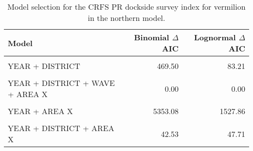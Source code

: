 \documentclass[
]{article}
\begin{document}
\begin{table}

\caption{\label{tab:tab-model-select-crfspr}Model selection for the CRFS PR dockside survey index for vermilion in the northern model.}
\centering
\begin{tabular}[t]{lrr}
\toprule
Model & Binomial $\Delta$AIC & Lognormal $\Delta$AIC\\
\midrule
\cellcolor{gray!6}{1} & \cellcolor{gray!6}{6137.96} & \cellcolor{gray!6}{1832.84}\\
YEAR + DISTRICT & 469.50 & 83.21\\
\cellcolor{gray!6}{YEAR + DISTRICT + WAVE} & \cellcolor{gray!6}{425.71} & \cellcolor{gray!6}{34.01}\\
YEAR + DISTRICT + WAVE + AREA X & 0.00 & 0.00\\
\cellcolor{gray!6}{YEAR + WAVE} & \cellcolor{gray!6}{5198.73} & \cellcolor{gray!6}{1446.58}\\
\addlinespace
YEAR + AREA X & 5353.08 & 1527.86\\
\cellcolor{gray!6}{YEAR + WAVE + AREA X} & \cellcolor{gray!6}{5024.99} & \cellcolor{gray!6}{1440.38}\\
YEAR + DISTRICT + AREA X & 42.53 & 47.71\\
\bottomrule
\end{tabular}
\end{table}

\FloatBarrier
\end{document}

